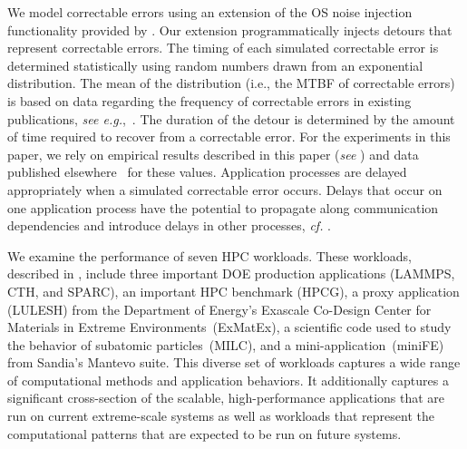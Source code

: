 We model correctable errors using an extension of the OS noise injection functionality provided
by \LogGOPSim.  Our extension programmatically injects detours that represent correctable errors.
The timing of each simulated correctable error is determined statistically using random numbers drawn from 
an exponential distribution.  The mean of the distribution (i.e., the MTBF of correctable errors)
is based on data regarding the frequency of correctable errors in existing publications, 
\emph{see e.g.},~\cite{Li10,Hwang12,Sridharan13,Bautista-Gomez:2016:Unprotected}.
The duration of the detour is determined by the amount of time required 
to recover from a correctable error.   For the experiments in this paper, we rely on empirical results 
described in this paper (\emph{see} ) and data published 
elsewhere~\cite{Gottscho:2017:Measuring} for these values.  
Application processes are delayed appropriately when a simulated correctable error occurs.
Delays that occur on one application process have the potential to propagate along
communication dependencies and introduce delays in other processes, \emph{cf.} .

We examine the performance of seven HPC workloads.  These workloads,
described in , include three important DOE production
applications (LAMMPS, CTH, and SPARC), an important HPC benchmark (HPCG), a
proxy application (LULESH) from the Department of Energy's Exascale Co-Design
Center for Materials in Extreme Environments~(ExMatEx), a scientific code used
to study the behavior of subatomic particles~(MILC), and a
mini-application~(miniFE) from Sandia's Mantevo suite.  This diverse set of
workloads captures a wide range of computational methods and application
behaviors.  It additionally captures a significant cross-section of the
scalable, high-performance applications that are run on current extreme-scale
systems as well as workloads that represent the computational patterns that are
expected to be run on future systems. 


\newcommand{\appDescWidth}{10.5cm}

